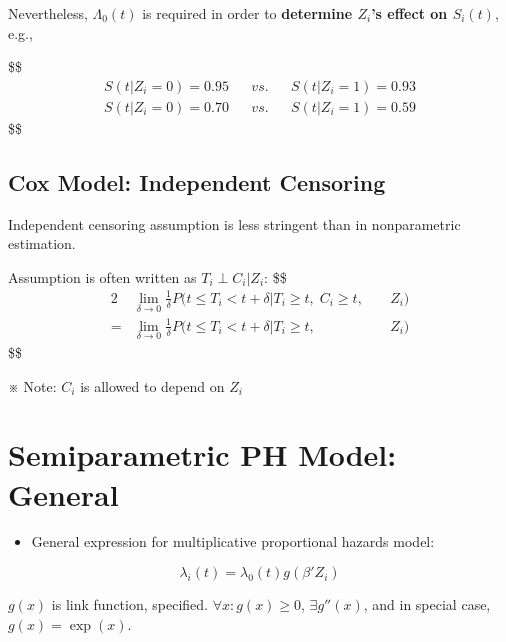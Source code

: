 \documentclass[
]{book}
\providecommand{\tightlist}{%
  \setlength{\itemsep}{0pt}\setlength{\parskip}{0pt}}
\theoremstyle{definition}
\theoremstyle{definition}
\theoremstyle{definition}
\theoremstyle{definition}
\theoremstyle{remark}
\begin{document}
Nevertheless, \(\Lambda_0(t)\) is required in order to \textbf{determine \(Z_i\)'s effect on \(S_i(t)\)}, e.g.,

\$\$
\begin{align}

S(t \Big | Z_i = 0) = 0.95 && vs. && S(t \Big | Z_i = 1) = 0.93


\\
S(t \Big | Z_i = 0) = 0.70 && vs. && S(t \Big | Z_i = 1) = 0.59



\end{align}
\$\$

\hypertarget{cox-model-independent-censoring}{%
\subsection{Cox Model: Independent Censoring}\label{cox-model-independent-censoring}}

Independent censoring assumption is less stringent than in nonparametric estimation.

Assumption is often written as \(T_i \perp C_i \Big \vert Z_i\):
\$\$
\begin{alignat}{2}

&\lim_{\delta \rightarrow 0} \frac{1}{\delta} P(t \le T_i < t+ \delta \Big | T_i \ge t , \; C_i \ge t , &&\; Z_i)
\\
= &\lim_{\delta \rightarrow 0} \frac{1}{\delta} P(t \le T_i < t+ \delta \Big | T_i \ge t ,  &&\; Z_i)

\end{alignat}
\$\$

※ Note: \(C_i\) is allowed to depend on \(Z_i\)

\hypertarget{semiparametric-ph-model-general}{%
\section{Semiparametric PH Model: General}\label{semiparametric-ph-model-general}}

\begin{itemize}
\tightlist
\item
  General expression for multiplicative proportional hazards model:
\end{itemize}

\[
\lambda_i (t) = \lambda_0 (t) g(\beta ' Z_i )
\]

\(g(x)\) is link function, specified. \(\forall x: g(x) \ge 0\), \(\exists g''(x)\), and in special case, \(g(x) = \exp(x)\).
\end{document}
